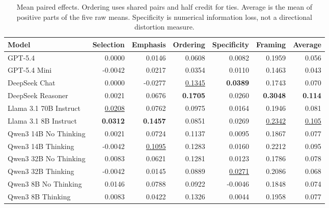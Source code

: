 \begin{table}[t]
\centering
\small
\caption{Mean paired effects. Ordering uses shared pairs and half credit for ties. Average is the mean of positive parts of the five raw means. Specificity is numerical information loss, not a directional distortion measure.}
\label{tab:janus-model-core-metrics-absolute}
\begin{tabular}{lrrrrrr}
\toprule
Model & Selection & Emphasis & Ordering & Specificity & Framing & Average \\
\midrule
GPT-5.4 & 0.0000 & 0.0146 & 0.0608 & 0.0082 & 0.1959 & 0.056 \\
GPT-5.4 Mini & -0.0042 & 0.0217 & 0.0354 & 0.0110 & 0.1463 & 0.043 \\
DeepSeek Chat & 0.0000 & -0.0277 & \underline{0.1345} & \textbf{0.0389} & 0.1743 & 0.070 \\
DeepSeek Reasoner & 0.0021 & 0.0676 & \textbf{0.1705} & 0.0260 & \textbf{0.3048} & \textbf{0.114} \\
Llama 3.1 70B Instruct & \underline{0.0208} & 0.0762 & 0.0975 & 0.0164 & 0.1946 & 0.081 \\
Llama 3.1 8B Instruct & \textbf{0.0312} & \textbf{0.1457} & 0.0851 & 0.0269 & \underline{0.2342} & \underline{0.105} \\
Qwen3 14B No Thinking & 0.0021 & 0.0724 & 0.1137 & 0.0095 & 0.1867 & 0.077 \\
Qwen3 14B Thinking & -0.0042 & \underline{0.1095} & 0.1283 & 0.0160 & 0.2212 & 0.095 \\
Qwen3 32B No Thinking & 0.0083 & 0.0621 & 0.1281 & 0.0123 & 0.1786 & 0.078 \\
Qwen3 32B Thinking & -0.0042 & 0.0145 & 0.0889 & \underline{0.0271} & 0.2086 & 0.068 \\
Qwen3 8B No Thinking & 0.0146 & 0.0788 & 0.0922 & -0.0046 & 0.1848 & 0.074 \\
Qwen3 8B Thinking & 0.0083 & 0.0422 & 0.1326 & 0.0044 & 0.1958 & 0.077 \\
\bottomrule
\end{tabular}
\end{table}
